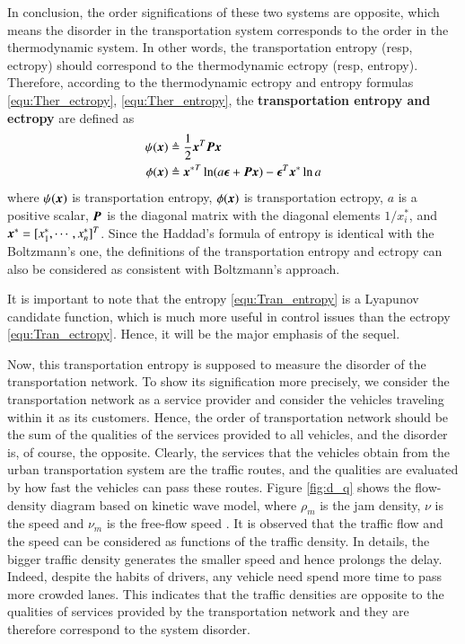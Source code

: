 \documentclass[preprint,authoryear,12pt]{elsarticle}
\renewcommand{\vec}[1]{\mbox{\boldmath$#1$}}
\newcommand{\mat}[1]{\mbox{\boldmath$#1$}}
\begin{document}
In conclusion, the order significations of these two systems are
opposite, which means the disorder in the transportation system
corresponds to the order in the thermodynamic system. In other words,
the transportation entropy (resp, ectropy) should correspond to the
thermodynamic ectropy (resp, entropy). Therefore, according to the
thermodynamic ectropy and entropy formulas \eqref{equ:Ther_ectropy},
\eqref{equ:Ther_entropy}, the \textbf{transportation entropy and
ectropy} are defined as
\begin{align}
\label{equ:Tran_entropy}
\psi(\vec{x}) &\triangleq \frac{1}{2}\vec{x}^T \mat{P} \vec{x}\\
\phi(\vec{x}) &\triangleq{\vec{x}^*}^T \ln
(a\vec{\epsilon}+\mat{P}\vec{x}) -\vec{\epsilon}^T\vec{x}^*\ln a
\label{equ:Tran_ectropy}
\end{align}
where $\psi(\vec{x})$ is transportation entropy, $\phi(\vec{x})$ is
transportation ectropy, $a$ is a positive scalar, $\mat{P}$ is the
diagonal matrix with the diagonal elements $1/x_i^*$, and
$\vec{x}^*=[x_1^*,\cdots,x_n^*]^T$. Since the Haddad's formula of
entropy is identical with the Boltzmann's one, the definitions of the
transportation entropy and ectropy can also be considered as
consistent with Boltzmann's approach.

It is important to note that the entropy \eqref{equ:Tran_entropy} is
a Lyapunov candidate function, which is much more useful in control
issues than the ectropy \eqref{equ:Tran_ectropy}. Hence, it will be
the major emphasis of the sequel.

Now, this transportation entropy is supposed to measure the disorder
of the transportation network. To show its signification more
precisely, we consider the transportation network as a service
provider and consider the vehicles traveling within it as its
customers. Hence, the order of transportation network should be the
sum of the qualities of the services provided to all vehicles, and
the disorder is, of course, the opposite. Clearly, the services that
the vehicles obtain from the urban transportation system are the
traffic routes, and the qualities are evaluated by how fast the
vehicles can pass these routes. Figure \ref{fig:d_q} shows the
flow-density diagram based on kinetic wave model, where $\rho_m$ is
the jam density, $\nu$ is the speed and $\nu_m$ is the free-flow
speed \citep{ukkusuri_robust_2010}. It is observed that the traffic
flow and the speed can be considered as functions of the traffic
density. In details, the bigger traffic density generates the smaller
speed and hence prolongs the delay. Indeed, despite the habits of
drivers, any vehicle need spend more time to pass more crowded lanes.
This indicates that the traffic densities are opposite to the
qualities of services provided by the transportation network and they
are therefore correspond to the system disorder.
\end{document}
